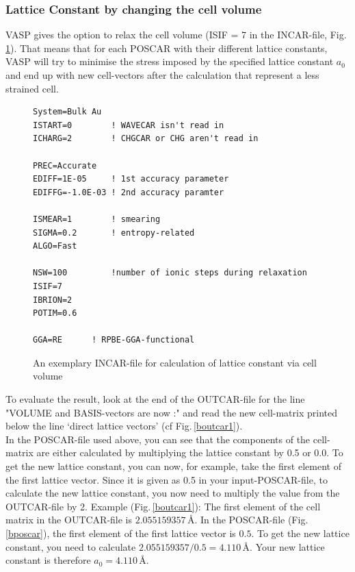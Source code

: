 \documentclass[twoside, 11pt, titlepage, captions=nooneline, a4paper, headsepline]{scrbook}%
\newcommand{\9}{\mathrm}
\newcommand{\0}{\,\mathrm}
\begin{document}
\subsubsection*{Lattice Constant by changing the cell volume}
VASP gives the option to relax the cell volume (ISIF = 7 in the INCAR-file, Fig.\,\ref{bincar1}). That means that for each POSCAR with their different lattice constants, VASP will try to minimise the stress imposed by the specified lattice constant $a_0$ and end up with new cell-vectors after the calculation that represent a less strained cell.
\begin{figure}[h!]
\begin{verbatim}
System=Bulk Au
ISTART=0		! WAVECAR isn't read in
ICHARG=2		! CHGCAR or CHG aren't read in

PREC=Accurate
EDIFF=1E-05		! 1st accuracy parameter
EDIFFG=-1.0E-03	! 2nd accuracy paramter

ISMEAR=1		! smearing
SIGMA=0.2		! entropy-related
ALGO=Fast

NSW=100			!number of ionic steps during relaxation
ISIF=7
IBRION=2
POTIM=0.6

GGA=RE		! RPBE-GGA-functional
\end{verbatim}
\caption{An exemplary INCAR-file for calculation of lattice constant via cell volume}
\label{bincar1}
\end{figure}
To evaluate the result, look at the end of the OUTCAR-file for the line "VOLUME and BASIS-vectors are now :" and read the new cell-matrix printed below the line `direct lattice vectors' (cf Fig.\,\ref{boutcar1}).\\
In the POSCAR-file used above, you can see that the components of the cell-matrix are either calculated by multiplying the lattice constant by 0.5 or 0.0. To get the new lattice constant, you can now, for example, take the first element of the first lattice vector. Since it is given as 0.5 in your input-POSCAR-file, to calculate the new lattice constant, you now need to multiply the value from the OUTCAR-file by 2. Example (Fig.\,\ref{boutcar1}): The first element of the cell matrix in the OUTCAR-file is $2.055159357$\,\AA. In the POSCAR-file (Fig.\,\ref{bposcar}), the first element of the first lattice vector is $0.5$. To get the new lattice constant, you need to calculate $2.055159357/0.5=4.110$\,\AA. Your new lattice constant is therefore $a_0=4.110$\,\AA.
\end{document}
